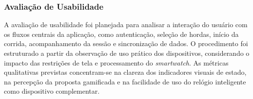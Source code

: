 \subsubsection{Avaliação de Usabilidade}

A avaliação de usabilidade foi planejada para analisar a interação do usuário com os fluxos centrais da aplicação, como autenticação, seleção de hordas, início da corrida, acompanhamento da sessão e sincronização de dados. O procedimento foi estruturado a partir da observação de uso prático dos dispositivos, considerando o impacto das restrições de tela e processamento do \textit{smartwatch}. As métricas qualitativas previstas concentram-se na clareza dos indicadores visuais de estado, na percepção da proposta gamificada e na facilidade de uso do relógio inteligente como dispositivo complementar.
